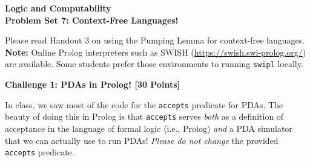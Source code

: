 \documentclass[11pt]{article}
\newcommand{\Problem}[3]{\mbox{} \newline \noindent \textbf{\textbf{Challenge #1: #2 [#3 Points] \\ }}}
\begin{document}
\begin{center}
	\bf
	Logic and Computability  \\
	Problem Set 7: Context-Free Languages! \\
\end{center}

\noindent Please read Handout 3 on using the Pumping Lemma for context-free languages.\\

\textbf{Note:} Online Prolog interpreters such as SWISH (\href{https://swish.swi-prolog.org/}{https://swish.swi-prolog.org/}) are available. Some students prefer those environments to running \texttt{swipl} locally.

\Problem{1}{PDAs in Prolog!}{30}

In class, we saw most of the code for the \verb+accepts+ predicate for PDAs.  The beauty of doing this in Prolog is that \verb+accepts+ serves \emph{both} as a definition of acceptance in the language of formal logic (i.e., Prolog) \emph{and} a PDA simulator that we can actually use to run PDAs!  \emph{Please do not change} the provided \verb+accepts+ predicate.
\end{document}
